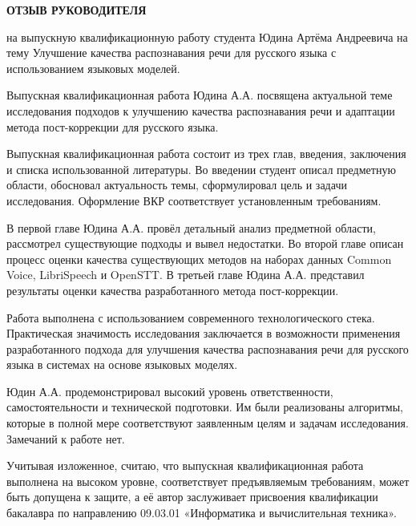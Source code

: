 \newpage
\clearpage
\begin{center}
    \textbf{ОТЗЫВ РУКОВОДИТЕЛЯ}
\end{center}

на выпускную квалификационную работу студента Юдина Артёма Андреевича на тему Улучшение качества распознавания речи для русского языка с использованием языковых моделей.

Выпускная квалификационная работа Юдина А.А. посвящена актуальной теме исследования подходов к улучшению качества распознавания речи и адаптации метода пост-коррекции для русского языка.

Выпускная квалификационная работа состоит из трех глав, введения, заключения и списка использованной литературы.
Во введении студент описал предметную области, обосновал актуальность темы, сформулировал цель и задачи исследования.
Оформление ВКР соответствует установленным требованиям.

В первой главе Юдина А.А. провёл детальный анализ предметной области, рассмотрел существующие подходы и вывел недостатки.
Во второй главе описан процесс оценки качества существующих методов на наборах данных Common Voice, LibriSpeech и OpenSTT.
В третьей главе Юдина А.А. представил результаты оценки качества разработанного метода пост-коррекции.

Работа выполнена с использованием современного технологического стека.
Практическая значимость исследования заключается в возможности применения разработанного подхода для улучшения качества распознавания речи для русского языка в системах на основе языковых моделях.

Юдин А.А. продемонстрировал высокий уровень ответственности, самостоятельности и технической подготовки.
Им были реализованы алгоритмы, которые в полной мере соответствуют заявленным целям и задачам исследования.
Замечаний к работе нет.

Учитывая изложенное, считаю, что выпускная квалификационная работа выполнена на высоком уровне, соответствует предъявляемым требованиям, может быть допущена к защите, а её автор заслуживает присвоения квалификации бакалавра по направлению 09.03.01 «Информатика и вычислительная техника».
\thispagestyle{empty}
